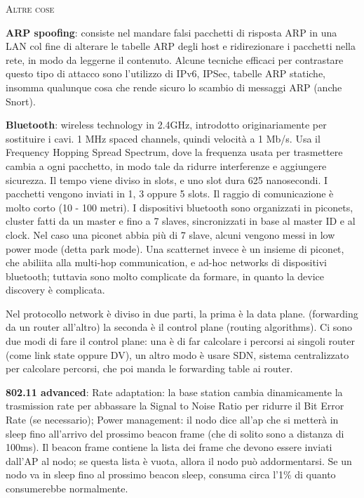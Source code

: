 \documentclass[a4paper,10pt]{article} %
\renewcommand{\b}[1]{%
    {\textbf{#1}}}
\begin{document}
\vspace{3pt}
\centerline{\textsc{ \normalsize {Altre cose}}}
\vspace{3pt}

\b{ARP spoofing}: consiste nel mandare falsi pacchetti di risposta ARP in una LAN col fine di alterare le tabelle ARP degli host e ridirezionare i pacchetti nella rete, in modo da leggerne il contenuto. Alcune tecniche efficaci per contrastare questo tipo di attacco sono l'utilizzo di IPv6, IPSec, tabelle ARP statiche, insomma qualunque cosa che rende sicuro lo scambio di messaggi ARP (anche Snort).

\b{Bluetooth}: wireless technology in 2.4GHz, introdotto originariamente per sostituire i cavi. 1 MHz spaced channels, quindi velocità a 1 Mb/s. Usa il Frequency Hopping Spread Spectrum, dove la frequenza usata per trasmettere cambia a ogni pacchetto, in modo tale da ridurre interferenze e aggiungere sicurezza. Il tempo viene diviso in slots, e uno slot dura 625 nanosecondi. I pacchetti vengono inviati in 1, 3 oppure 5 slots. Il raggio di comunicazione è molto corto (10 - 100 metri). I dispositivi bluetooth sono organizzati in piconets, cluster fatti da un master e fino a 7 slaves, sincronizzati in base al master ID e al clock. Nel caso una piconet abbia più di 7 slave, alcuni vengono messi in low power mode (detta park mode). Una scatternet invece è un insieme di piconet, che abiliita alla multi-hop communication, e ad-hoc networks di dispositivi bluetooth; tuttavia sono molto complicate da formare, in quanto la device discovery è complicata.

Nel protocollo network è diviso in due parti, la prima è la data plane. (forwarding da un router all'altro) la seconda è il control plane (routing algorithms). Ci sono due modi di fare il control plane: una è di far calcolare i percorsi ai singoli router (come link state oppure DV), un altro modo è usare SDN, sistema centralizzato per calcolare percorsi, che poi manda le forwarding table ai router. 

\b{802.11 advanced}: Rate adaptation: la base station cambia dinamicamente la trasmission rate per abbassare la Signal to Noise Ratio per ridurre il Bit Error Rate (se necessario); Power management: il nodo dice all'ap che si metterà in sleep fino all'arrivo del prossimo beacon frame (che di solito sono a distanza di 100ms). Il beacon frame contiene la lista dei frame che devono essere inviati dall'AP al nodo; se questa lista è vuota, allora il nodo può addormentarsi. Se un nodo va in sleep fino al prossimo beacon sleep, consuma circa l'1\% di quanto consumerebbe normalmente.
\end{document}
